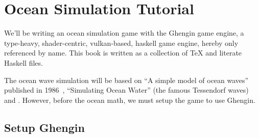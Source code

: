 \newcommand{\framedhslinecorrect}[2]%
  {#1[#2]}

\newcommand{\framedhs}{\sethscode{framedhscode}}


\newenvironment{inlinehscode}%
  {\(\def\column##1##2{}%
   \let\>\undefined\let\<\undefined\let\\\undefined
   \newcommand\>[1][]{}\newcommand\<[1][]{}\newcommand\\[1][]{}%
   \def\fromto##1##2##3{##3}%
   \def\nextline{}}{\) }%

\newcommand{\inlinehs}{\sethscode{inlinehscode}}


\newenvironment{joincode}%
  {\let\orighscode=\hscode
   \let\origendhscode=\endhscode
   \def\endhscode{\def\hscode{\endgroup\def\@currenvir{hscode}\\}\begingroup}
   \orighscode\def\hscode{\endgroup\def\@currenvir{hscode}}}%
  {\origendhscode
   \global\let\hscode=\orighscode
   \global\let\endhscode=\origendhscode}%

\makeatother
\EndFmtInput
%


\chapter{Ocean Simulation Tutorial}

We'll be writing an ocean simulation game with the Ghengin game engine, a
type-heavy, shader-centric, vulkan-based, haskell game engine, hereby only
referenced by name. This book is written as a collection of TeX and literate
Haskell files.

The ocean wave simulation will be based on ``A simple model of ocean waves''
published in 1986~\cite{10.1145/15886.15894}, ``Simulating Ocean Water'' (the
famous Tessendorf waves)~\cite{tessendorfocean} and
\cite{10.1145/2791261.2791267}.  However, before the ocean math, we must setup
the game to use Ghengin.

\section{Setup Ghengin}

